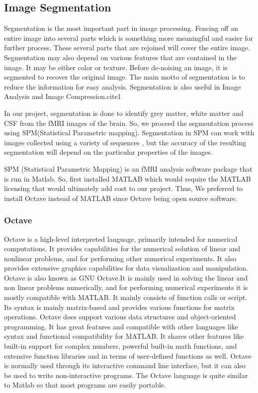 \documentclass{article}
\begin{document}
\subsection{Image Segmentation}

Segmentation is the most important part in image processing. Fencing
off an entire image into several parts which is something more
meaningful and easier for further process. These several parts that
are rejoined will cover the entire image. Segmentation may also depend
on various features that are contained in the image. It may be either
color or texture. Before de-noising an image, it is segmented to
recover the original image. The main motto of segmentation is to
reduce the information for easy analysis. Segmentation is also useful
in Image Analysis and Image Compression.{cite1}

In our project, segmentation is done to identify grey matter, white
matter and CSF from the fMRI images of the brain. So, we proceed the
segmentation process using SPM(Statistical Parametric mapping).
Segmentation in SPM can work with images collected using a variety of
sequences , but the accuracy of the resulting segmentation will depend
on the particular properties of the images.

SPM (Statistical Parametric Mapping) is an fMRI analysis software
package that is run in Matlab. So, first installed MATLAB which would
require the MATLAB licensing that would ultimately add cost to our
project. Thus, We preferred to install Octave instead of MATLAB since
Octave being open source software.

\subsubsection{Octave}

Octave is a high-level interpreted language,
primarily intended for numerical computations. It provides
capabilities for the numerical solution of linear and nonlinear
problems, and for performing other numerical experiments. It also
provides extensive graphics capabilities for data visualization and
manipulation. Octave is also known as GNU Octave.It is mainly used in
solving the linear and non linear problems numerically, and for
performing numerical experiments it is mostly compatible with MATLAB.
It mainly consists of function calls or script. Its syntax is mainly
matrix-based and provides various functions for matrix operations.
Octave does support various data structures and object-oriented
programming. It has great features and compatible with other languages
like syntax and functional compatibility for MATLAB. It shares other
features like built-in support for complex numbers, powerful built-in
math functions, and extensive function libraries and in terms of
user-defined functions as well. Octave is normally used
through its interactive command line interface, but it can also be
used to write non-interactive programs. The Octave language is quite
similar to Matlab so that most programs are easily portable.
\end{document}
